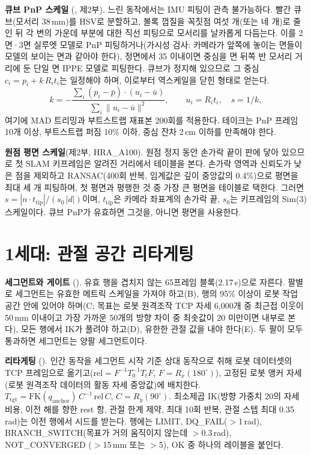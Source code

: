 \documentclass[conference,10pt]{IEEEtran}
\newcommand{\mm}{\,mm\xspace}
\begin{document}
\textbf{큐브 PnP 스케일} (, 제2부). 느린 동작에서는 IMU 피팅이 관측 불가능하다. 빨간 큐브(모서리
38\mm)를 HSV로 분할하고, 볼록 껍질을 꼭짓점 여섯 개(또는 네 개)로 줄인 뒤 각 변의 가운데 부분에 대한 직선 피팅으로 모서리를
날카롭게 다듬는다. 이를 2면·3면 실루엣 모델로 PnP 피팅하거나(가시성 검사: 카메라가 앞쪽에 놓이는 면들이 모델의 보이는 면과 같아야
한다), 정면에서 35\textdegree{} 이내이면 중심을 면 뒤쪽 반 모서리 거리에 둔 단일 면 IPPE 모델로 피팅한다. 큐브가 정지해 있으므로 그
중심 $c_i=p_i + k\,R_i t_i$는 일정해야 하며, 이로부터 역스케일을 닫힌 형태로 얻는다.
\begin{equation}
k = -\frac{\sum_i (p_i-\bar p)\cdot(u_i-\bar u)}{\sum_i\lVert u_i-\bar u\rVert^2},\qquad u_i=R_i t_i,\quad s=1/k,
\end{equation}
여기에 MAD 트리밍과 부트스트랩 재표본 200회를 적용한다. 테이크는 PnP 프레임 10개 이상, 부트스트랩 퍼짐 10\% 이하, 중심 잔차
2\,cm 이하를 만족해야 한다.

\textbf{원점 평면 스케일}(제2부, HRA\_A100). 원점 정지 동안 손가락 끝이 판에 닿아 있으므로 첫 SLAM 키프레임은 알려진 거리에서
테이블을 본다. 손가락 영역과 신뢰도가 낮은 점을 제외하고 RANSAC(400회 반복, 임계값은 깊이 중앙값의 0.4\%)으로 평면을 최대 세 개
피팅하며, 첫 평면과 평행한 것 중 가장 큰 평면을 테이블로 택한다. 그러면 $s=|n\cdot t_\text{tip}|/(s_0\,|d|)$이며, $t_\text{tip}$은
카메라 좌표계의 손가락 끝, $s_0$는 키프레임의 Sim(3) 스케일이다. 큐브 PnP가 유효하면 그것을, 아니면 평면을 사용한다.

\section{1세대: 관절 공간 리타게팅}\label{m:sec:gen1}
\textbf{세그먼트와 게이트} (). 유효 행을 겹치지 않는 65프레임 블록(2.17\,s)으로 자른다. 팔별로 세그먼트는 유효한
메트릭 스케일을 가져야 하고(B), 행의 95\% 이상이 로봇 작업 공간 안에 있어야 하며(C; 목표는 로봇 원격조작 TCP 자세 6{,}000개 중
최근접 이웃이 50\mm{} 이내이고 가장 가까운 50개의 방향 차이 중 최솟값이 20\textdegree{} 미만이면 내부로 본다), 모든 행에서 IK가
풀려야 하고(D), 유한한 관절 값을 내야 한다(E). 두 팔이 모두 통과하면 세그먼트는 양팔 세그먼트이다.

\textbf{리타게팅} (). 인간 동작을 세그먼트 시작 기준 상대 동작으로 취해 로봇
데이터셋의 TCP 프레임으로 옮기고($\text{rel}=F^{-1}T_{0}^{-1}T_{t}F$, $F=R_x(180^\circ)$), 고정된 로봇 앵커 자세(로봇 원격조작
데이터의 활동 자세 중앙값)에 배치한다. $T_\text{tgt}=\mathrm{FK}(q_\text{anchor})\,C^{-1}\,\text{rel}\,C$, $C=R_y(90^\circ)$.
최소제곱 IK(방향 가중치 20의 자세 비용, 이전 해를 향한 rest 항, 관절 한계 제약, 최대 10회 반복, 관절 스텝 최대 0.35\,rad)는 이전
행에서 시드를 받는다. 행에는 LIMIT, DQ\_FAIL($>$1\,rad), BRANCH\_SWITCH(목표가 거의 움직이지 않는데 $>$0.3\,rad), NOT\_CONVERGED
($>$15\mm{} 또는 $>$5\textdegree), OK 중 하나의 레이블을 붙인다.
\end{document}
